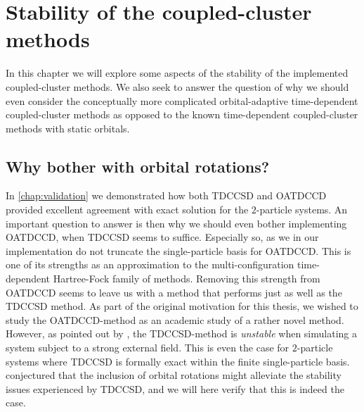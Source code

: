 \chapter{Stability of the coupled-cluster methods}
    \label{chap:stability}
    In this chapter we will explore some aspects of the stability of the
    implemented coupled-cluster methods.
    We also seek to answer the question of why we should even consider the
    conceptually more complicated orbital-adaptive time-dependent
    coupled-cluster methods as opposed to the known time-dependent
    coupled-cluster methods with static orbitals.

    \section{Why bother with orbital rotations?}
        In \autoref{chap:validation} we demonstrated how both TDCCSD and OATDCCD
        provided excellent agreement with exact solution for the $2$-particle
        systems.
        An important question to answer is then why we should even bother
        implementing OATDCCD, when TDCCSD seems to suffice.
        Especially so, as we in our implementation do not truncate the
        single-particle basis for OATDCCD.
        This is one of its strengths as an approximation to the
        multi-configuration time-dependent Hartree-Fock family of methods.
        Removing this strength from OATDCCD seems to leave us with a method that
        performs just as well as the TDCCSD method.
        As part of the original motivation for this thesis, we wished to study
        the OATDCCD-method as an academic study of a rather novel method.
        However, as pointed out by \citeauthor{pedersen2018symplectic}
        \cite{pedersen2018symplectic}, the TDCCSD-method is \emph{unstable} when
        simulating a system subject to a strong external field.
        This is even the case for $2$-particle systems where TDCCSD is formally
        exact within the finite single-particle basis.
        \citeauthor{pedersen2018symplectic} conjectured that the inclusion of
        orbital rotations might alleviate the stability issues experienced by
        TDCCSD, and we will here verify that this is indeed the case.


